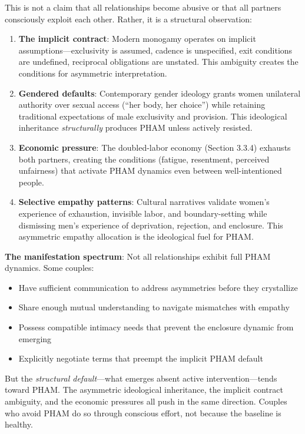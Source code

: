 \documentclass[12pt, letterpaper]{article}
\begin{document}
This is not a claim that all relationships become abusive or that all partners consciously exploit each other. Rather, it is a structural observation:

\begin{enumerate}
    \item \textbf{The implicit contract}: Modern monogamy operates on implicit assumptions---exclusivity is assumed, cadence is unspecified, exit conditions are undefined, reciprocal obligations are unstated. This ambiguity creates the conditions for asymmetric interpretation.
    
    \item \textbf{Gendered defaults}: Contemporary gender ideology grants women unilateral authority over sexual access (``her body, her choice'') while retaining traditional expectations of male exclusivity and provision. This ideological inheritance \textit{structurally} produces PHAM unless actively resisted.
    
    \item \textbf{Economic pressure}: The doubled-labor economy (Section 3.3.4) exhausts both partners, creating the conditions (fatigue, resentment, perceived unfairness) that activate PHAM dynamics even between well-intentioned people.
    
    \item \textbf{Selective empathy patterns}: Cultural narratives validate women's experience of exhaustion, invisible labor, and boundary-setting while dismissing men's experience of deprivation, rejection, and enclosure. This asymmetric empathy allocation is the ideological fuel for PHAM.
\end{enumerate}

\textbf{The manifestation spectrum}: Not all relationships exhibit full PHAM dynamics. Some couples:
\begin{itemize}
    \item Have sufficient communication to address asymmetries before they crystallize
    \item Share enough mutual understanding to navigate mismatches with empathy
    \item Possess compatible intimacy needs that prevent the enclosure dynamic from emerging
    \item Explicitly negotiate terms that preempt the implicit PHAM default
\end{itemize}

But the \textit{structural default}---what emerges absent active intervention---tends toward PHAM. The asymmetric ideological inheritance, the implicit contract ambiguity, and the economic pressures all push in the same direction. Couples who avoid PHAM do so through conscious effort, not because the baseline is healthy.
\end{document}
